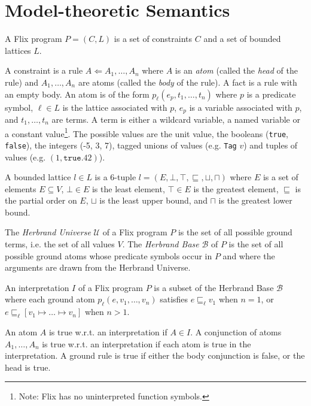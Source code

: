 \documentclass[10pt,twocolumn]{article}
\begin{document}
\section{Model-theoretic Semantics}

A Flix program $P = (C, L)$ is a set of constraints $C$ and a set of bounded lattices $L$.

A constraint is a rule $A \Leftarrow A_1, \dots, A_n$ 
where $A$ is an \emph{atom} (called the \emph{head} of the rule) 
and $A_1, \dots, A_n$ are atoms (called the \emph{body} of the rule).
A fact is a rule with an empty body.
An atom is of the form $p_\ell(e_p, t_1, \dots, t_n)$ where 
$p$ is a predicate symbol,
$\ell \in L$ is the lattice associated with $p$,
$e_p$ is a variable associated with $p$, and 
$t_1, \dots, t_n$ are terms. 
A term is either a wildcard variable, a named variable or a constant value\footnote{Note: Flix has no uninterpreted function symbols.}. 
The possible values are the unit value, the booleans (\texttt{true}, \texttt{false}),
the integers (-5, 3, 7), tagged unions of values (e.g. \texttt{Tag} $v$) and 
tuples of values (e.g. $(1, \texttt{true}. 42)$).

A bounded lattice $l \in L$ is a 6-tuple $l = (E, \bot, \top, \sqsubseteq, \sqcup, \sqcap)$ where 
$E$ is a set of elements $E \subseteq V$,
$\bot \in E$ is the least element,
$\top \in E$ is the greatest element,
$\sqsubseteq$ is the partial order on $E$,
$\sqcup$ is the least upper bound, and
$\sqcap$ is the greatest lower bound.

The \emph{Herbrand Universe} $\mathcal{U}$ of a Flix program $P$ is the set of 
all possible ground terms, i.e. the set of all values $V$.
The \emph{Herbrand Base} $\mathcal{B}$ of $P$ is the set of all possible ground atoms whose
predicate symbols occur in $P$ and where the arguments are drawn from the Herbrand Universe.


An interpretation $I$ of a Flix program $P$ is a subset of the Herbrand Base $\mathcal{B}$ where 
each ground atom $p_\ell(e, v_1, \dots, v_n)$ satisfies 
$e \sqsubseteq_\ell v_1$ when $n = 1$, or 
$e \sqsubseteq_\ell [v_1 \mapsto \dots \mapsto v_n]$ when $n > 1$.

An atom $A$ is true w.r.t. an interpretation if $A \in I$. 
A conjunction of atoms $A_1, \dots, A_n$ is true w.r.t. an interpretation if each atom is true in the interpretation.
A ground rule is true if either the body conjunction is false, or the head is true.
\end{document}
